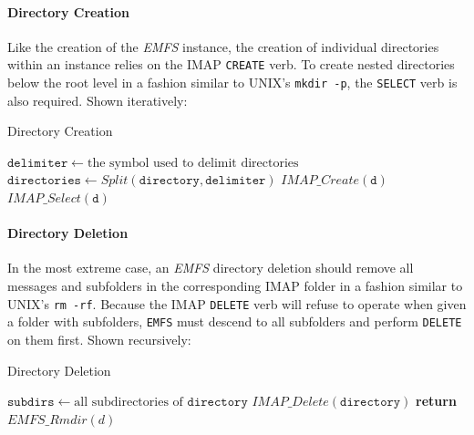 \documentclass[12pt]{article}
\begin{document}
\paragraph{Directory Creation}

Like the creation of the \textit{EMFS} instance, the creation of individual
directories within an instance relies on the IMAP \texttt{CREATE} verb. To
create nested directories below the root level in a fashion similar to UNIX's
\texttt{mkdir -p}, the \texttt{SELECT} verb is also required. Shown iteratively:

\begin{algorithm}
\caption{Directory Creation}
\begin{algorithmic}[1]
\State $\mathtt{delimiter} \gets \text{the symbol used to delimit directories}$
\State $\mathtt{directories} \gets \mathit{Split}(\mathtt{directory}, \mathtt{delimiter})$
\State $\mathit{IMAP\_Create}(\mathtt{d})$
\EndIf
\State $\mathit{IMAP\_Select}(\mathtt{d})$
\EndFor
\EndProcedure
\end{algorithmic}
\end{algorithm}

\paragraph{Directory Deletion}

In the most extreme case, an \textit{EMFS} directory deletion should remove
all messages and subfolders in the corresponding IMAP folder in a fashion
similar to UNIX's \texttt{rm -rf}. Because the IMAP \texttt{DELETE} verb
will refuse to operate when given a folder with subfolders, \texttt{EMFS} must
descend to all subfolders and perform \texttt{DELETE} on them first. Shown
recursively:

\begin{algorithm}
\caption{Directory Deletion}
\begin{algorithmic}[1]
\State $\mathtt{subdirs} \gets \text{all subdirectories of } \mathtt{directory}$
\State $\mathit{IMAP\_Delete}(\texttt{directory})$
\State \textbf{return}
\Else
{}
\State $\mathit{EMFS\_Rmdir}(\textit{d})$
\EndFor
\EndIf
\EndProcedure
\end{algorithmic}
\end{algorithm}
\end{document}
